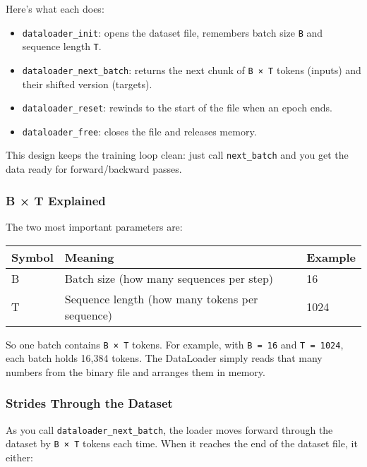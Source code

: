 \documentclass[
  letterpaper,
  DIV=11,
  numbers=noendperiod]{scrreprt}
\providecommand{\tightlist}{%
  \setlength{\itemsep}{0pt}\setlength{\parskip}{0pt}}
\begin{document}
Here's what each does:

\begin{itemize}
\tightlist
\item
  \texttt{dataloader\_init}: opens the dataset file, remembers batch
  size \texttt{B} and sequence length \texttt{T}.
\item
  \texttt{dataloader\_next\_batch}: returns the next chunk of
  \texttt{B\ ×\ T} tokens (inputs) and their shifted version (targets).
\item
  \texttt{dataloader\_reset}: rewinds to the start of the file when an
  epoch ends.
\item
  \texttt{dataloader\_free}: closes the file and releases memory.
\end{itemize}

This design keeps the training loop clean: just call
\texttt{next\_batch} and you get the data ready for forward/backward
passes.

\subsubsection{B × T Explained}\label{b-t-explained}

The two most important parameters are:

\begin{longtable}[]{@{}lll@{}}
\toprule\noalign{}
Symbol & Meaning & Example \\
\midrule\noalign{}
\endhead
\bottomrule\noalign{}
\endlastfoot
B & Batch size (how many sequences per step) & 16 \\
T & Sequence length (how many tokens per sequence) & 1024 \\
\end{longtable}

So one batch contains \texttt{B\ ×\ T} tokens. For example, with
\texttt{B\ =\ 16} and \texttt{T\ =\ 1024}, each batch holds 16,384
tokens. The DataLoader simply reads that many numbers from the binary
file and arranges them in memory.

\subsubsection{Strides Through the
Dataset}\label{strides-through-the-dataset}

As you call \texttt{dataloader\_next\_batch}, the loader moves forward
through the dataset by \texttt{B\ ×\ T} tokens each time. When it
reaches the end of the dataset file, it either:
\end{document}
